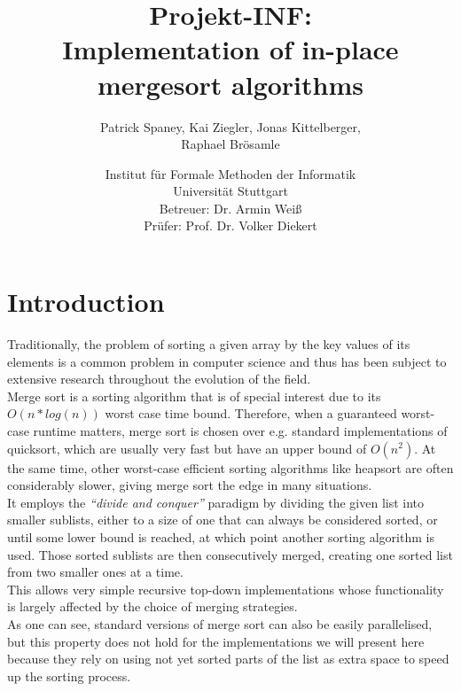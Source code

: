 \documentclass[11pt,pdftex,a4paper, twocolumn]{article}
\begin{document}
\title{Projekt-INF:\\
Implementation of in-place mergesort algorithms}
\author{Patrick Spaney, Kai Ziegler, Jonas Kittelberger, \\ Raphael Brösamle}
\date{Institut für Formale Methoden der Informatik \\ Universität Stuttgart\\
\normalsize Betreuer: Dr. Armin Weiß\\
Prüfer: Prof. Dr. Volker Diekert}
\maketitle
\section*{Introduction}
Traditionally, the problem of sorting a given array by the key values of its elements is a common problem in computer science and thus has been subject to extensive research throughout the evolution of the field. \\
Merge sort is a sorting algorithm that is of special interest due to its $O(n*log(n))$ worst case time bound. Therefore, when a guaranteed worst-case runtime matters, merge sort is chosen over e.g. standard implementations of quicksort, which are usually very fast but have an upper bound of $O(n^{2})$. At the same time, other worst-case efficient sorting algorithms like heapsort are often considerably slower, giving merge sort the edge in many situations. \\
It employs the \textit{“divide and conquer”} paradigm by dividing the given list into smaller sublists, either to a size of one that can always be considered sorted, or until some lower bound is reached, at which point another sorting algorithm is used. Those sorted sublists are then consecutively merged, creating one sorted list from two smaller ones at a time. \\
This allows very simple recursive top-down implementations whose functionality is largely affected by the choice of merging strategies. \\
As one can see, standard versions of merge sort can also be easily parallelised, but this property does not hold for the implementations we will present here because they rely on using not yet sorted parts of the list as extra space to speed up the sorting process. \\
\end{document}
